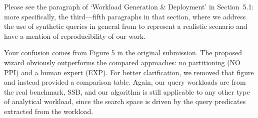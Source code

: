 \documentclass[10pt,letterpaper]{article}
\newenvironment{myindentpar}[1]%
{\begin{list}{}
         {\vspace{10pt}
					\setlength{\leftmargin}{#1}}
          \item[]
}
{\end{list}}
\newcommand{\rev}[1]{\begin{myindentpar}{.25in} {\em {\color{blue}{#1}}}\end{myindentpar}}
\begin{document}
Please see the paragraph of `Workload Generation \& Deployment' in Section~5.1: more specifically, the third---fifth
paragraphs in that section, where we address the use of synthetic queries in general from to represent a realistic scenario and have a mention of reproducibility of our work.

\rev{
According to the bar-shaped results, the WIZARD does not provide optimal results compared to the state-of the arts. They must clearly be expressed how this cases can be used in the real-time scenarios. 
}

Your confusion comes from Figure 5 in the original submission. The proposed wizard obviously outperforms the compared approaches: no partitioning (NO PPI) and a human expert (EXP). For better clarification, we removed that figure and instead provided a comparison table. Again, our query workloads are from the real benchmark, SSB, and our algorithm is still applicable to any other type of analytical workload, since the search space is driven by the query predicates extracted from the workload.

\rev{
Also, Authors should give a more clear definition of the ``application type" used in the paper. For example, what information of applications are used and how to obtain this information. 
}
\end{document}
